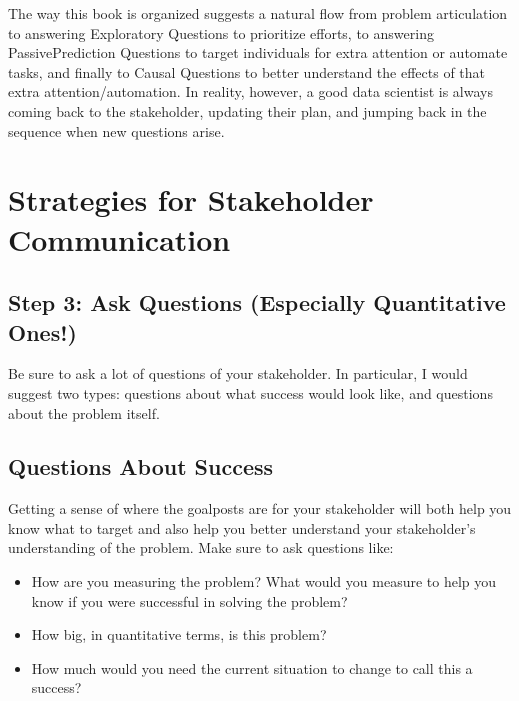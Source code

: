 \documentclass[letterpaper,10pt,english]{jupyterBook}
\begin{document}
\sphinxAtStartPar
The way this book is organized suggests a natural flow from problem articulation to answering Exploratory Questions to prioritize efforts, to answering Passive\sphinxhyphen{}Prediction Questions to target individuals for extra attention or automate tasks, and finally to Causal Questions to better understand the effects of that extra attention/automation. In reality, however, a good data scientist is always coming back to the stakeholder, updating their plan, and jumping back in the sequence when new questions arise.


\section{Strategies for Stakeholder Communication}
\label{\detokenize{20_problems_to_questions/20_stakeholder_management:strategies-for-stakeholder-communication}}

\subsection{Step 3: Ask Questions (Especially Quantitative Ones!)}
\label{\detokenize{20_problems_to_questions/20_stakeholder_management:step-3-ask-questions-especially-quantitative-ones}}
\sphinxAtStartPar
Be sure to ask a lot of questions of your stakeholder. In particular, I would suggest two types: questions about what success would look like, and questions about the problem itself.


\subsection{Questions About Success}
\label{\detokenize{20_problems_to_questions/20_stakeholder_management:questions-about-success}}
\sphinxAtStartPar
Getting a sense of where the goalposts are for your stakeholder will both help you know what to target and also help you better understand your stakeholder’s understanding of the problem. Make sure to ask questions like:
\begin{itemize}
\item {} 
\sphinxAtStartPar
How are you measuring the problem? What would you measure to help you know if you were successful in solving the problem?

\item {} 
\sphinxAtStartPar
How big, in quantitative terms, is this problem?

\item {} 
\sphinxAtStartPar
How much would you need the current situation to change to call this a success?

\end{itemize}
\end{document}
